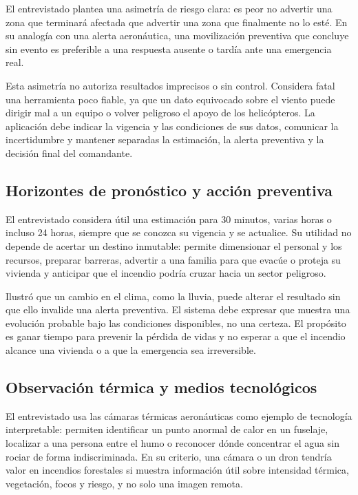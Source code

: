 El entrevistado plantea una asimetría de riesgo clara: es peor no advertir una zona que terminará afectada que advertir una zona que finalmente no lo esté. En su analogía con una alerta aeronáutica, una movilización preventiva que concluye sin evento es preferible a una respuesta ausente o tardía ante una emergencia real.

Esta asimetría no autoriza resultados imprecisos o sin control. Considera fatal una herramienta poco fiable, ya que un dato equivocado sobre el viento puede dirigir mal a un equipo o volver peligroso el apoyo de los helicópteros. La aplicación debe indicar la vigencia y las condiciones de sus datos, comunicar la incertidumbre y mantener separadas la estimación, la alerta preventiva y la decisión final del comandante.

\subsection{Horizontes de pronóstico y acción preventiva}

El entrevistado considera útil una estimación para 30 minutos, varias horas o incluso 24 horas, siempre que se conozca su vigencia y se actualice. Su utilidad no depende de acertar un destino inmutable: permite dimensionar el personal y los recursos, preparar barreras, advertir a una familia para que evacúe o proteja su vivienda y anticipar que el incendio podría cruzar hacia un sector peligroso.

Ilustró que un cambio en el clima, como la lluvia, puede alterar el resultado sin que ello invalide una alerta preventiva. El sistema debe expresar que muestra una evolución probable bajo las condiciones disponibles, no una certeza. El propósito es ganar tiempo para prevenir la pérdida de vidas y no esperar a que el incendio alcance una vivienda o a que la emergencia sea irreversible.

\subsection{Observación térmica y medios tecnológicos}

El entrevistado usa las cámaras térmicas aeronáuticas como ejemplo de tecnología interpretable: permiten identificar un punto anormal de calor en un fuselaje, localizar a una persona entre el humo o reconocer dónde concentrar el agua sin rociar de forma indiscriminada. En su criterio, una cámara o un dron tendría valor en incendios forestales si muestra información útil sobre intensidad térmica, vegetación, focos y riesgo, y no solo una imagen remota.

